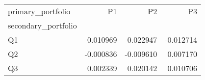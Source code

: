 \begin{tabular}{lrrr}
\toprule
primary_portfolio & P1 & P2 & P3 \\
secondary_portfolio &  &  &  \\
\midrule
Q1 & 0.010969 & 0.022947 & -0.012714 \\
Q2 & -0.000836 & -0.009610 & 0.007170 \\
Q3 & 0.002339 & 0.020142 & 0.010706 \\
\bottomrule
\end{tabular}
